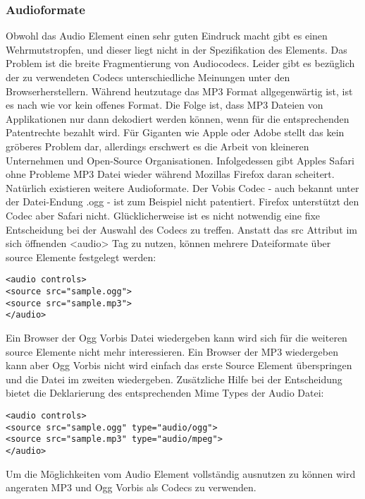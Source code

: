 \subsubsection{Audioformate}
Obwohl das Audio Element einen sehr guten Eindruck macht gibt es einen Wehrmutstropfen,
und dieser liegt nicht in der Spezifikation des Elements. Das Problem ist die breite Fragmentierung
von Audiocodecs. Leider gibt es bezüglich der zu verwendeten Codecs unterschiedliche Meinungen
unter den Browserherstellern. Während heutzutage das MP3 Format allgegenwärtig ist,
ist es nach wie vor kein offenes Format. Die Folge ist, dass MP3 Dateien von Applikationen nur
dann dekodiert werden können, wenn für die entsprechenden Patentrechte bezahlt wird.
Für Giganten wie Apple oder Adobe stellt das kein gröberes Problem dar, allerdings erschwert es die
Arbeit von kleineren Unternehmen und Open-Source Organisationen. Infolgedessen gibt
Apples Safari ohne Probleme MP3 Datei wieder während Mozillas Firefox daran scheitert.
\newline\newline
Natürlich existieren weitere Audioformate. Der Vobis Codec - auch bekannt unter der Datei-Endung
.ogg - ist zum Beispiel nicht patentiert. Firefox unterstützt den Codec aber Safari nicht.
\newline\newline
Glücklicherweise ist es nicht notwendig eine fixe Entscheidung bei der Auswahl des Codecs zu treffen.
Anstatt das src Attribut im sich öffnenden <audio> Tag zu nutzen, können mehrere Dateiformate
über source Elemente festgelegt werden:
\begin{verbatim}
<audio controls>
<source src="sample.ogg">
<source src="sample.mp3">
</audio>
\end{verbatim}
Ein Browser der Ogg Vorbis Datei wiedergeben kann wird sich für die weiteren source Elemente
nicht mehr interessieren. Ein Browser der MP3 wiedergeben kann aber Ogg Vorbis nicht wird
einfach das erste Source Element überspringen und die Datei im zweiten wiedergeben.
Zusätzliche Hilfe bei der Entscheidung bietet die Deklarierung des entsprechenden
Mime Types der Audio Datei:
\begin{verbatim}
<audio controls>
<source src="sample.ogg" type="audio/ogg">
<source src="sample.mp3" type="audio/mpeg">
</audio>
\end{verbatim}
Um die Möglichkeiten vom Audio Element vollständig ausnutzen zu können wird angeraten
MP3 und Ogg Vorbis als Codecs zu verwenden.

